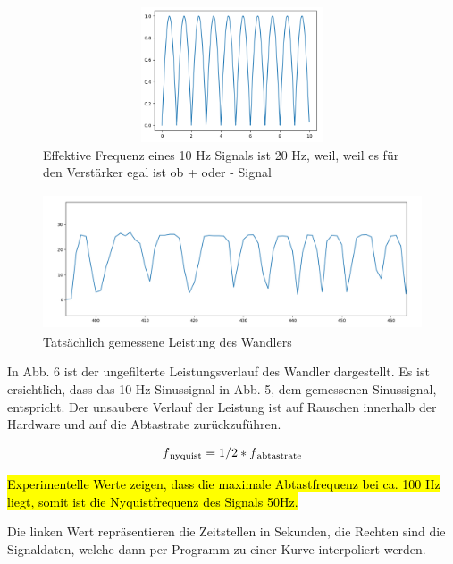 \begin{figure}
    \centering
    \includegraphics[height= 4cm, width = 12cm]{Pictures/Clapped_Sine.png}
    \caption{Effektive Frequenz eines 10 Hz Signals ist 20 Hz, weil, weil es für den Verstärker egal ist ob + oder - Signal }
\end{figure}

\begin{figure}
    \centering
    \includegraphics[height= 4cm, width = 12cm]{Pictures/TatsDaten.png}
    \caption{Tatsächlich gemessene Leistung des Wandlers}
\end{figure}


In Abb. 6 ist der ungefilterte Leistungsverlauf des Wandler dargestellt. Es ist ersichtlich, dass das 10 Hz Sinussignal in Abb. 5, dem gemessenen Sinussignal, entspricht. Der unsaubere Verlauf der Leistung ist auf Rauschen innerhalb der Hardware und auf die Abtastrate zurückzuführen. 


\begin{equation}
\label{Sigmoid}
f\textsubscript{nyquist} = 1/2 * f\textsubscript{abtastrate}
\end{equation}

\hl{Experimentelle Werte zeigen, dass die maximale Abtastfrequenz bei ca. 100 Hz liegt, somit ist die Nyquistfrequenz des Signals 50Hz.}

Die linken Wert repräsentieren die Zeitstellen in Sekunden, die Rechten sind die Signaldaten, welche dann per Programm zu einer Kurve interpoliert werden. 

